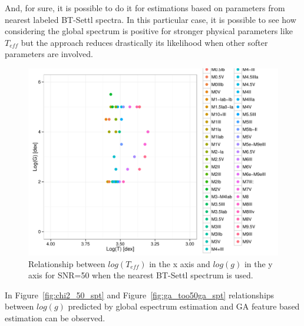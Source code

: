 And, for sure, it is possible to do it for estimations based on 
parameters from nearest labeled BT-Settl spectra.
In this particular case, it is possible to see how 
considering the global spectrum is positive for stronger 
physical parameters like $T_{eff}$ but the approach
reduces drastically its likelihood when other softer 
parameters are involved.

\begin{figure}
 \begin{center}
 \includegraphics[width=12cm]{figs/LT_LG_chi2.pdf}
 \caption{Relationship between $log(T_{eff}) $ in the x axis 
 and $log(g)$ in the y axis for SNR=50 when 
 the nearest BT-Settl spectrum is used.}
 \label{fig:lt_lg_chi2}
 \end{center}
\end{figure}


In Figure~\ref{fig:chi2_50_spt} and Figure~\ref{fig:ga_too50ga_spt} 
relationships between $log(g)$ predicted by global espectrum estimation 
and GA feature based estimation can be observed.

